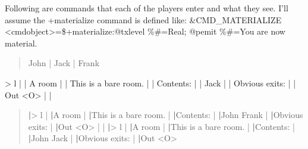 \documentclass[letterpaper,10pt,english]{sphinxmanual}
\begin{document}
\sphinxAtStartPar
Following are commands that each of the players enter and what they see.
I’ll assume the +materialize command is defined like:
\&CMD\_MATERIALIZE \textless{}cmdobject\textgreater{}=\$+materialize:@txlevel \%\#=Real; @pemit \%\#=You
are now material.
\begin{quote}
\begin{description}
\item[{John            |         Jack          |         Frank}] \leavevmode
\begin{DUlineblock}{0em}
\item[] {\color{red}\bfseries{}|}
\end{DUlineblock}

\end{description}
\end{quote}

\sphinxAtStartPar
\textgreater{} l                     |                       |
A room                  |                       |
This is a bare room.    |                       |
Contents:               |                       |
Jack                    |                       |
Obvious exits:          |                       |
Out \textless{}O\textgreater{}                 |                       |
\begin{quote}

\sphinxAtStartPar
{\color{red}\bfseries{}|}\textgreater{} l                    |
{\color{red}\bfseries{}|}A room                 |
{\color{red}\bfseries{}|}This is a bare room.   |
{\color{red}\bfseries{}|}Contents:              |
{\color{red}\bfseries{}|}John Frank             |
{\color{red}\bfseries{}|}Obvious exits:         |
{\color{red}\bfseries{}|}Out \textless{}O\textgreater{}                |
|                       {\color{red}\bfseries{}|}\textgreater{} l
|                       {\color{red}\bfseries{}|}A room
|                       {\color{red}\bfseries{}|}This is a bare room.
|                       {\color{red}\bfseries{}|}Contents:
|                       {\color{red}\bfseries{}|}John Jack
|                       {\color{red}\bfseries{}|}Obvious exits:
|                       {\color{red}\bfseries{}|}Out \textless{}O\textgreater{}
\end{quote}
\end{document}
